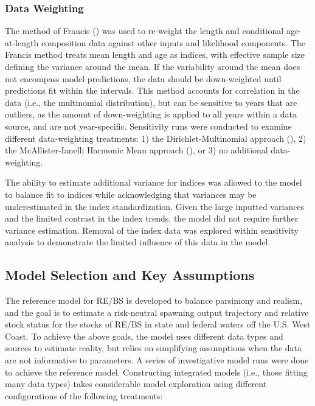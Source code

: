 \documentclass[
]{scrartcl}
\begin{document}
\subsubsection{Data Weighting}\label{data-weighting}

The method of Francis () was used
to re-weight the length and conditional age-at-length composition data
against other inputs and likelihood components. The Francis method
treats mean length and age as indices, with effective sample size
defining the variance around the mean. If the variability around the
mean does not encompass model predictions, the data should be
down-weighted until predictions fit within the intervals. This method
accounts for correlation in the data (i.e., the multinomial
distribution), but can be sensitive to years that are outliers, as the
amount of down-weighting is applied to all years within a data source,
and are not year-specific. Sensitivity runs were conducted to examine
different data-weighting treatments: 1) the Dirichlet-Multinomial
approach (), 2) the McAllister-Ianelli Harmonic Mean approach
(),
or 3) no additional data-weighting.

The ability to estimate additional variance for indices was allowed to
the model to balance fit to indices while acknowledging that variances
may be underestimated in the index standardization. Given the large
inputted variances and the limited contrast in the index trends, the
model did not require further variance estimation. Removal of the index
data was explored within sensitivity analysis to demonstrate the limited
influence of this data in the model.

\subsection{Model Selection and Key
Assumptions}\label{model-selection-and-key-assumptions}

The reference model for RE/BS is developed to balance parsimony and
realism, and the goal is to estimate a risk-neutral spawning output
trajectory and relative stock status for the stocks of RE/BS in state
and federal waters off the U.S. West Coast. To achieve the above goals,
the model uses different data types and sources to estimate reality, but
relies on simplifying assumptions when the data are not informative to
parameters. A series of investigative model runs were done to achieve
the reference model. Constructing integrated models (i.e., those fitting
many data types) takes considerable model exploration using different
configurations of the following treatments:
\end{document}
